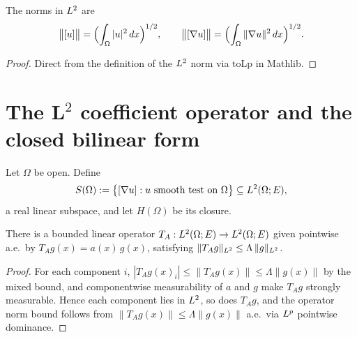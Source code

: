 \begin{lemma}
\label{lem:norm_smoothFunToLp_eq}
\leanok
{}
The norms in $L^{2}$ are
\begin{equation*}
  \bigl\|[u]\bigr\| = \Bigl(\int_{\Omega} |u|^{2}\,dx\Bigr)^{1/2}, \qquad
  \bigl\|[\nabla u]\bigr\| = \Bigl(\int_{\Omega} \|\nabla u\|^{2}\,dx\Bigr)^{1/2}.
\end{equation*}
\end{lemma}

\begin{proof}
\leanok

Direct from the definition of the $L^{2}$ norm via $\mathrm{toLp}$ in Mathlib.
\end{proof}

\section{The L\texorpdfstring{$^2$}{2} coefficient operator and the closed bilinear form}

\begin{definition}
\label{def:smoothGradSubmodule}
\leanok
{}
Let $\Omega$ be open. Define
\begin{equation*}
  S(\Omega) := \bigl\{ [\nabla u] : u \text{ smooth test on } \Omega \bigr\} \subseteq L^{2}(\Omega; E),
\end{equation*}
a real linear subspace, and let $H(\Omega)$ be its closure.
\end{definition}

\begin{lemma}
\label{lem:coeffMulLpL}
\leanok
{}
There is a bounded linear operator $T_A : L^{2}(\Omega;E) \to L^{2}(\Omega;E)$ given pointwise a.e.\ by $T_A g (x) = a(x)\,g(x)$, satisfying $\|T_A g\|_{L^{2}} \leq \Lambda\,\|g\|_{L^{2}}$.
\end{lemma}

\begin{proof}
\leanok
{}

For each component $i$, $|T_A g(x)_i| \leq \|T_A g(x)\| \leq \Lambda\|g(x)\|$ by the mixed bound, and componentwise measurability of $a$ and $g$ make $T_A g$ strongly measurable. Hence each component lies in $L^{2}$, so does $T_A g$, and the operator norm bound follows from $\|T_A g(x)\| \leq \Lambda\|g(x)\|$ a.e.\ via $L^{p}$ pointwise dominance.
\end{proof}

